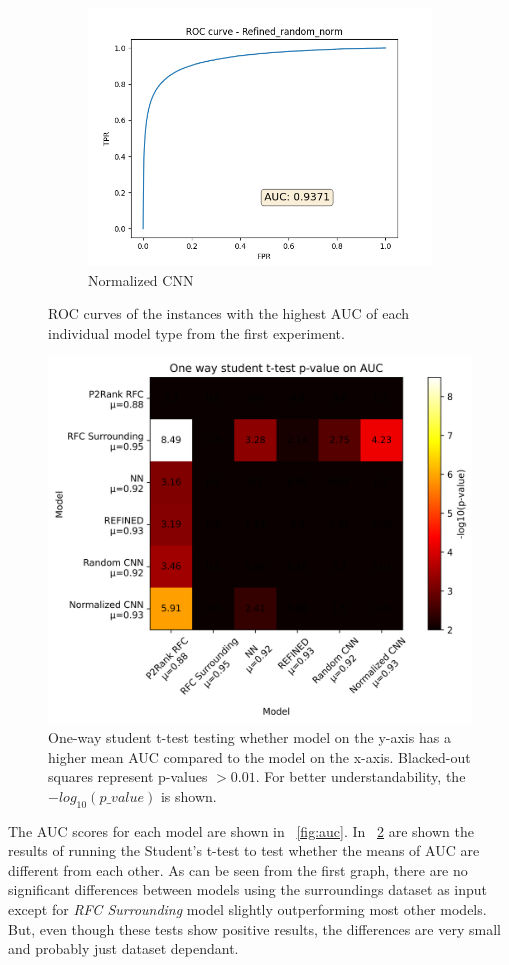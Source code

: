 \begin{figure}
\begin{subfigure}{0.45\textwidth}
    \includegraphics[width=0.95\linewidth]{norm_roc.png}
    \caption{Normalized CNN}
\end{subfigure}%
\caption{ROC curves of the instances with the highest AUC of each individual model type from the first experiment.}
\label{fig:roc_curves}
\end{figure}

\begin{figure}
    \centering
    \includegraphics[width=0.75\linewidth]{ab1.png}
    \caption{One-way student t-test testing whether model on the y-axis has a higher mean AUC compared to the model on the x-axis. Blacked-out squares represent p-values $> 0.01$. For better understandability, the $-log_{10}(p\_value)$ is shown.}
    \label{fig:ab1}
\end{figure}

The AUC scores for each model are shown in ~\ref{fig:auc}. In ~\ref{fig:ab1} are shown the results of running the Student's t-test to test whether the means of AUC are different from each other. As can be seen from the first graph, there are no significant differences between models using the surroundings dataset as input except for \textit{RFC Surrounding} model slightly outperforming most other models. But, even though these tests show positive results, the differences are very small and probably just dataset dependant.

